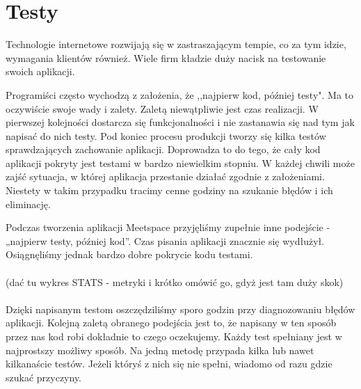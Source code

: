 \section{Testy}
  \label{testy}
    Technologie internetowe rozwijają się w zastraszającym tempie, co za tym idzie, wymagania klientów również. Wiele firm kładzie duży nacisk na testowanie swoich aplikacji.

    Programiści często wychodzą z założenia, że ,,najpierw kod, później testy". Ma to oczywiście swoje wady i zalety. Zaletą niewątpliwie jest czas realizacji. W pierwszej kolejności dostarcza się funkcjonalności i nie zastanawia się nad tym jak napisać do nich testy. Pod koniec procesu produkcji tworzy się kilka testów sprawdzających zachowanie aplikacji. Doprowadza to do tego, że cały kod aplikacji pokryty jest testami w bardzo niewielkim stopniu. W każdej chwili może zajść sytuacja, w której aplikacja przestanie działać zgodnie z założeniami. Niestety w takim przypadku tracimy cenne godziny na szukanie błędów i ich eliminację.

    Podczas tworzenia aplikacji Meetspace przyjęliśmy zupełnie inne podejście - „najpierw testy, później kod”. Czas pisania aplikacji znacznie się wydłużył. Osiągnęliśmy jednak bardzo dobre pokrycie kodu testami. \\ \\
    (dać tu wykres STATS - metryki i krótko omówić go, gdyż jest tam duży skok) \\ \\
    Dzięki napisanym testom oszczędziliśmy sporo godzin przy diagnozowaniu błędów aplikacji. Kolejną zaletą obranego podejścia jest to, że napisany w ten sposób przez nas kod robi dokładnie to czego oczekujemy. Każdy test spełniany jest w najprostszy możliwy sposób. Na jedną metodę przypada kilka lub nawet kilkanaście testów. Jeżeli któryś z nich się nie spełni, wiadomo od razu gdzie szukać przyczyny.

